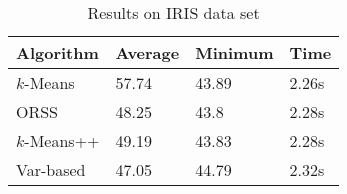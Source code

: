 \documentclass[twoside, 11pt]{article}
\begin{document}
		\begin{table}
			\begin{center}
				\begin{tabular}{|l|l|l|l|}
					\hline
					Algorithm & Average & Minimum & Time\\\hline
					$k$-Means & 57.74& 43.89& 2.26s\\\hline
					ORSS & 48.25& 43.8& 2.28s\\\hline
					$k$-Means++ & 49.19& 43.83& 2.28s\\\hline
					Var-based & 47.05& 44.79& 2.32s\\\hline
				\end{tabular}
				\caption{Results on IRIS data set}
			\end{center}
			\label{tbl:iris}
		\end{table}
\end{document}
